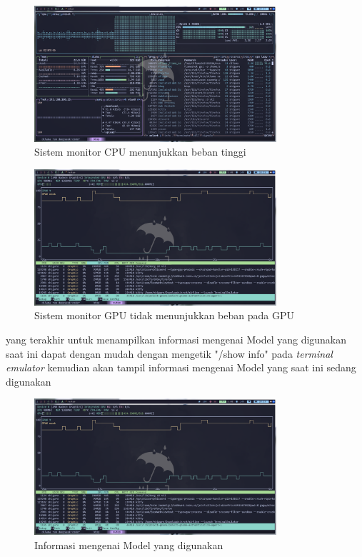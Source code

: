 \documentclass[a4paper,12pt, bahasa]{article}
\begin{document}
\begin{figure}[H]
  \begin{center}
    \includegraphics[width=0.80\textwidth]{images/gambar6.png}
    \caption{Sistem monitor CPU menunjukkan beban tinggi}
  \end{center}
\end{figure}
\begin{figure}[H]
  \begin{center}
    \includegraphics[width=0.80\textwidth]{images/gambar7.png}
    \caption{Sistem monitor GPU tidak menunjukkan beban pada GPU}
  \end{center}
\end{figure}

yang terakhir untuk menampilkan informasi mengenai Model yang digunakan saat ini dapat dengan mudah dengan mengetik "/show info" pada \textit{terminal emulator} kemudian akan tampil informasi mengenai Model yang saat ini sedang digunakan 
\begin{figure}[H]
  \begin{center}
    \includegraphics[width=0.80\textwidth]{images/gambar7.png}
    \caption{Informasi mengenai Model yang digunakan}
  \end{center}
\end{figure}
\end{document}
